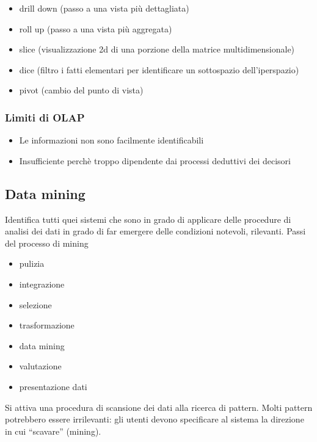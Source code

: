 \begin{itemize}

\item
  drill down (passo a una vista pi\`u dettagliata)
\item
  roll up (passo a una vista pi\`u aggregata)
\item
  slice (visualizzazione 2d di una porzione della matrice
  multidimensionale)
\item
  dice (filtro i fatti elementari per identificare un sottospazio
  dell'iperspazio)
\item
  pivot (cambio del punto di vista)
\end{itemize}

\subsubsection{Limiti di OLAP}\label{limiti-di-olap}

\begin{itemize}

\item
  Le informazioni non sono facilmente identificabili
\item
  Insufficiente perch\`e troppo dipendente dai processi deduttivi dei
  decisori
\end{itemize}

\subsection{Data mining}\label{data-mining}

Identifica tutti quei sistemi che sono in grado di applicare delle
procedure di analisi dei dati in grado di far emergere delle condizioni
notevoli, rilevanti. Passi del processo di mining

\begin{itemize}

\item
  pulizia
\item
  integrazione
\item
  selezione
\item
  trasformazione
\item
  data mining
\item
  valutazione
\item
  presentazione dati
\end{itemize}

Si attiva una procedura di scansione dei dati alla ricerca di pattern.
Molti pattern potrebbero essere irrilevanti: gli utenti devono
specificare al sistema la direzione in cui ``scavare'' (mining).

